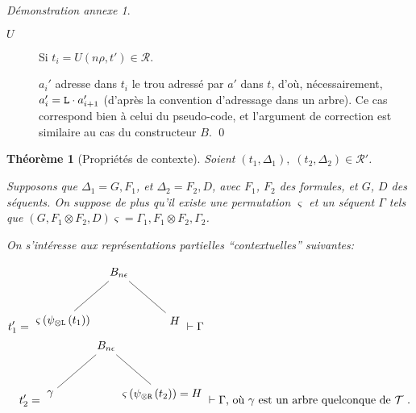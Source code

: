 \documentclass[11pt,a4paper]{article}
\theoremstyle{plain}
\newtheorem{theorem}{Théorème}
\theoremstyle{definition}
\theoremstyle{remark}
\newtheorem{demonstrationappendix}{Démonstration annexe}
\newcommand*{\tensor}{\otimes}
\newcommand*{\permapp}[2]{#2 #1}
\newcommand*{\someperm}{\varsigma}
\newcommand*{\sequent}{\Gamma}
\newcommand*{\sequentbis}{\Delta}
\newcommand*{\Left}{\textnormal{\texttt{L}}}
\newcommand*{\Right}{\textnormal{\texttt{R}}}
\newcommand*{\trees}{\ensuremath{\mathcal{T}}}
\newcommand*{\representations}{\ensuremath{\mathcal{R}}}
\newcommand*{\representationspartial}{\ensuremath{\mathcal{R'}}}
\newcommand*{\unknown}{H}
\begin{document}
\begin{demonstrationappendix}
\begin{description}
\begin{description}
            \item[$U$] Si $t_i = U(n\rho, t') \in \representations$.
    
            $a_i'$ adresse dans $t_i$ le trou adressé par $a'$ dans $t$, d'où, nécessairement, $a_i' = \Left \cdot a_{i+1}'$ (d'après la convention d'adressage dans un arbre). Ce cas correspond bien à celui du pseudo-code, et l'argument de correction est similaire au cas du constructeur $B$.
\qed
        \end{description}
    \end{description}
\end{demonstrationappendix}

\begin{theorem}[Propriétés de contexte]
    \label{context_prop}
    Soient $(t_1, \sequentbis_1), \;  (t_2, \sequentbis_2) \in \representationspartial$. 
    
    Supposons que $\sequentbis_1 = G, F_1$, et $\sequentbis_2 = F_2, D$, avec $F_1$, $F_2$ des formules, et $G$, $D$ des séquents. On suppose de plus qu'il existe une permutation $\someperm$ et un séquent $\sequent$ tels que $\permapp{\someperm}{(G, F_1 \tensor F_2, D)} = \sequent_1, F_1 \tensor F_2, \sequent_2$.

    On s'intéresse aux représentations partielles ``contextuelles'' suivantes:

    \begin{align*}
        \begin{multlined}
            t'_1 = \begin{tikzpicture}%
            [level 1/.style={sibling distance=3.5cm}]
            \node {$B_{n \epsilon}$}
                child {node {$\someperm \left( \psi_{\tensor\Left} \left(
                t_1\right) \right)$}}
                child {node {$\unknown$}
            };
            \end{tikzpicture}
            \vdash \sequent \\
            t'_2 = \begin{tikzpicture}%
            [level 1/.style={sibling distance=3.5cm}]
            \node {$B_{n \epsilon}$}
                child {node {$\gamma$}}
                child {node {$\someperm \left( \psi_{\tensor\Right} \left(t_2\right) \right) = \unknown$}
            };
            \end{tikzpicture}
            \vdash \sequent \text{, où $\gamma$ est un arbre quelconque de $\trees$ }.
        \end{multlined}
    \end{align*}
    

\end{theorem}
\end{document}
